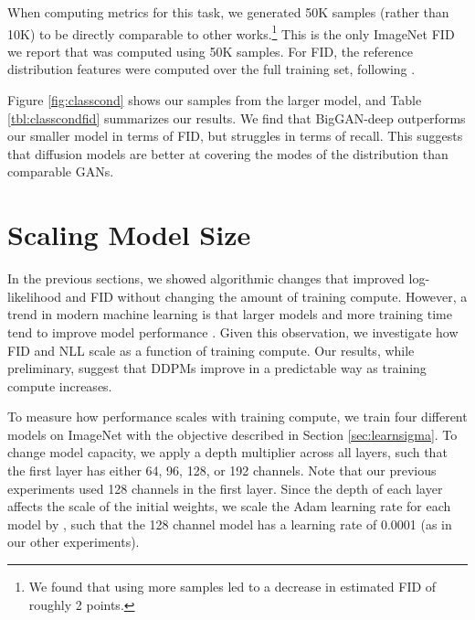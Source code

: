 \documentclass{article}
\begin{document}
When computing metrics for this task, we generated 50K samples (rather than 10K) to be directly comparable to other works.\footnote{We found that using more samples led to a decrease in estimated FID of roughly 2 points.} This is the only ImageNet  FID we report that was computed using 50K samples. For FID, the reference distribution features were computed over the full training set, following \cite{biggan}.

Figure \ref{fig:classcond} shows our samples from the larger model, and Table \ref{tbl:classcondfid} summarizes our results. We find that BigGAN-deep outperforms our smaller model in terms of FID, but struggles in terms of recall. This suggests that diffusion models are better at covering the modes of the distribution than comparable GANs.

\section{Scaling Model Size}
\label{sec:scaling}

In the previous sections, we showed algorithmic changes that improved log-likelihood and FID without changing the amount of training compute. However, a trend in modern machine learning is that larger models and more training time tend to improve model performance \citep{scalinglaws,igpt,gpt3}. Given this observation, we investigate how FID and NLL scale as a function of training compute. Our results, while preliminary, suggest that DDPMs improve in a predictable way as training compute increases.

To measure how performance scales with training compute, we train four different models on ImageNet  with the  objective described in Section \ref{sec:learnsigma}. To change model capacity, we apply a depth multiplier across all layers, such that the first layer has either 64, 96, 128, or 192 channels. Note that our previous experiments used 128 channels in the first layer. Since the depth of each layer affects the scale of the initial weights, we scale the Adam \citep{adam} learning rate for each model by , such that the 128 channel model has a learning rate of 0.0001 (as in our other experiments).
\end{document}
